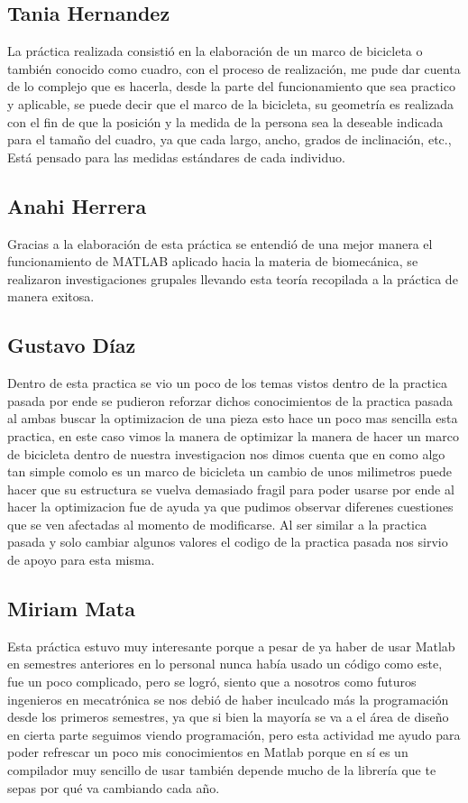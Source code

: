 \documentclass{article}
\begin{document}
\subsection{Tania  Hernandez}
La práctica realizada consistió en la elaboración de un marco de bicicleta o también conocido como cuadro, con el proceso de realización, me pude dar cuenta de lo complejo que es hacerla, desde la parte del funcionamiento que sea practico y aplicable, se puede decir que el marco de la bicicleta, su geometría es realizada con el fin de que la posición y la medida de la persona sea la deseable indicada para el tamaño del cuadro, ya que cada largo, ancho, grados de inclinación, etc., Está pensado para las medidas estándares de cada individuo.
\subsection{Anahi Herrera}
Gracias a la elaboración de esta práctica se entendió de una mejor manera el funcionamiento de MATLAB aplicado hacia la materia de biomecánica, se realizaron investigaciones grupales llevando esta teoría recopilada a la práctica de manera exitosa. 
\subsection{Gustavo  Díaz}
Dentro de esta practica se vio un poco de los temas vistos dentro de la practica pasada por ende se pudieron reforzar dichos conocimientos de la practica pasada al ambas buscar la optimizacion de una pieza esto hace un poco mas sencilla esta practica, en este caso vimos la manera de optimizar la manera de hacer un marco de bicicleta dentro de nuestra investigacion nos dimos cuenta que en como algo tan simple comolo es un marco de bicicleta un cambio de unos milimetros puede hacer que su estructura se vuelva demasiado fragil para poder usarse por ende al hacer la optimizacion fue de ayuda ya que pudimos observar diferenes cuestiones que se ven afectadas al momento de modificarse. Al ser similar a la practica pasada y solo cambiar algunos valores el codigo de la practica pasada nos sirvio de apoyo para esta misma.
\subsection{Miriam  Mata}
Esta práctica estuvo muy interesante porque a pesar de ya haber de usar Matlab en semestres anteriores en lo personal nunca había usado un código como este, fue un poco complicado, pero se logró, siento que a nosotros como futuros ingenieros en mecatrónica se nos debió de haber inculcado más la programación desde los primeros semestres, ya que si bien la mayoría se va a el área de diseño en cierta parte seguimos viendo programación, pero esta actividad me ayudo para poder refrescar un poco mis conocimientos en Matlab porque en sí es un compilador muy sencillo de usar también depende mucho de la librería que te sepas por qué va cambiando cada año.
\end{document}
